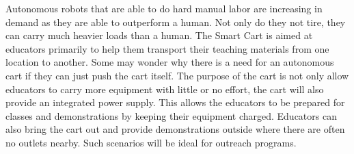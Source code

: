 Autonomous robots that are able to do hard manual labor are increasing in demand as they are able to outperform a human. Not only do they not tire, they can carry much heavier loads than a human. The Smart Cart is aimed at educators primarily to help them transport their teaching materials from one location to another. Some may wonder why there is a need for an autonomous cart if they can just push the cart itself. The purpose of the cart is not only allow educators to carry more equipment with little or no effort, the cart will also provide an integrated power supply. This allows the educators to be prepared for classes and demonstrations by keeping their equipment charged. Educators can also bring the cart out and provide demonstrations outside where there are often no outlets nearby. Such scenarios will be ideal for outreach programs. 
